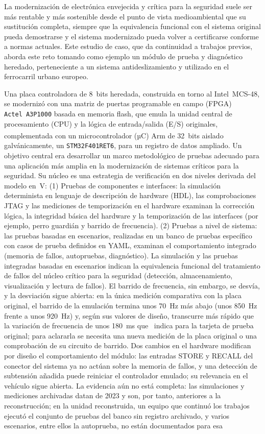 La modernización de electrónica envejecida y crítica para la seguridad suele ser más rentable y más sostenible desde el punto de vista medioambiental que su sustitución completa, siempre que la equivalencia funcional con el sistema original pueda demostrarse y el sistema modernizado pueda volver a certificarse conforme a normas actuales. Este estudio de caso, que da continuidad a trabajos previos, aborda este reto tomando como ejemplo un módulo de prueba y diagnóstico heredado, perteneciente a un sistema antideslizamiento y utilizado en el ferrocarril urbano europeo.

Una placa controladora de 8~bits heredada, construida en torno al Intel~MCS-48, se modernizó con una matriz de puertas programable en campo (FPGA) \texttt{Actel~A3P1000} basada en memoria flash, que emula la unidad central de procesamiento (CPU) y la lógica de entrada/salida (E/S) originales, complementada con un microcontrolador (µC) Arm\textsuperscript{\textregistered} de 32~bits aislado galvánicamente, un \texttt{STM32F401RET6}, para un registro de datos ampliado. Un objetivo central era desarrollar un marco metodológico de pruebas adecuado para una aplicación más amplia en la modernización de sistemas críticos para la seguridad. Su núcleo es una estrategia de verificación en dos niveles derivada del modelo en~V: (1) Pruebas de componentes e interfaces: la simulación determinista en lenguaje de descripción de hardware (HDL), las comprobaciones JTAG y las mediciones de temporización en el hardware examinan la corrección lógica, la integridad básica del hardware y la temporización de las interfaces (por ejemplo, perro guardián y barrido de frecuencia). (2) Pruebas a nivel de sistema: las pruebas basadas en escenarios, realizadas en un banco de pruebas específico~\cite{dolata2023} con casos de prueba definidos en YAML, examinan el comportamiento integrado (memoria de fallos, autopruebas, diagnóstico). La simulación y las pruebas integradas basadas en escenarios indican la equivalencia funcional del tratamiento de fallos del núcleo crítico para la seguridad (detección, almacenamiento, visualización y lectura de fallos). El barrido de frecuencia, sin embargo, se desvía, y la desviación sigue abierta: en la única medición comparativa con la placa original, el barrido de la emulación termina unos 70~Hz más abajo (unos 850~Hz frente a unos 920~Hz) y, según sus valores de diseño, transcurre más rápido que la variación de frecuencia de unos 180~ms que~\cite{dolata2023} indica para la tarjeta de prueba original; para aclararla se necesita una nueva medición de la placa original o una comprobación de su circuito de barrido. Dos cambios en el hardware modifican por diseño el comportamiento del módulo: las entradas STORE y RECALL del conector del sistema ya no actúan sobre la memoria de fallos, y una detección de subtensión añadida puede reiniciar el controlador emulado; su relevancia en el vehículo sigue abierta. La evidencia aún no está completa: las simulaciones y mediciones archivadas datan de 2023 y son, por tanto, anteriores a la reconstrucción; en la unidad reconstruida, un equipo que continuó los trabajos ejecutó el conjunto de pruebas del banco sin registro archivado, y varios escenarios, entre ellos la autoprueba, no están documentados para esa 
